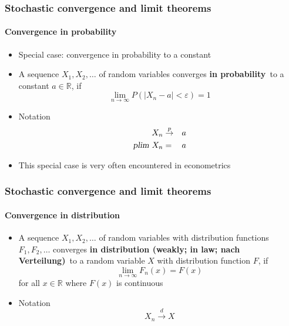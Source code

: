 \documentclass[notes=show]{beamer}
\begin{document}
\begin{frame}\frametitle{Stochastic convergence and limit theorems}\framesubtitle{Convergence in probability}
\begin{itemize}
    \item Special case: convergence in probability to a constant
    \item A sequence $X_{1},X_{2},\ldots $ of random variables converges \newline \textbf{in probability}\emph{\ }to a constant $a\in \mathbb{R}$, if
        \begin{equation*}
            \lim_{n\rightarrow \infty }P\left( |X_{n}-a|<\varepsilon \right) =1
        \end{equation*}
    \item Notation
        \begin{eqnarray*}
            X_{n} &\overset{p}{\rightarrow }&a \\
            \textsl{plim}~X_{n} &=&a
        \end{eqnarray*}
    \item This special case is very often encountered in econometrics
\end{itemize}
\end{frame}


\begin{frame}\frametitle{Stochastic convergence and limit theorems}\framesubtitle{Convergence in distribution}
\begin{itemize}
    \item A sequence $X_{1},X_{2},\ldots $ of random variables with distribution functions $F_{1},F_{2},\ldots $ converges \textbf{in distribution (weakly; in law; nach Verteilung)}\emph{\ }to a random variable $X$ with distribution function $F$, if
        \begin{equation*}
            \lim_{n\rightarrow \infty }F_{n}(x)=F(x)
        \end{equation*}
        for all $x\in \mathbb{R}$ where $F(x)$ is continuous
\item Notation
    \begin{equation*}
        X_{n}\overset{d}{\rightarrow }X
    \end{equation*}
\end{itemize}
\end{frame}
\end{document}
